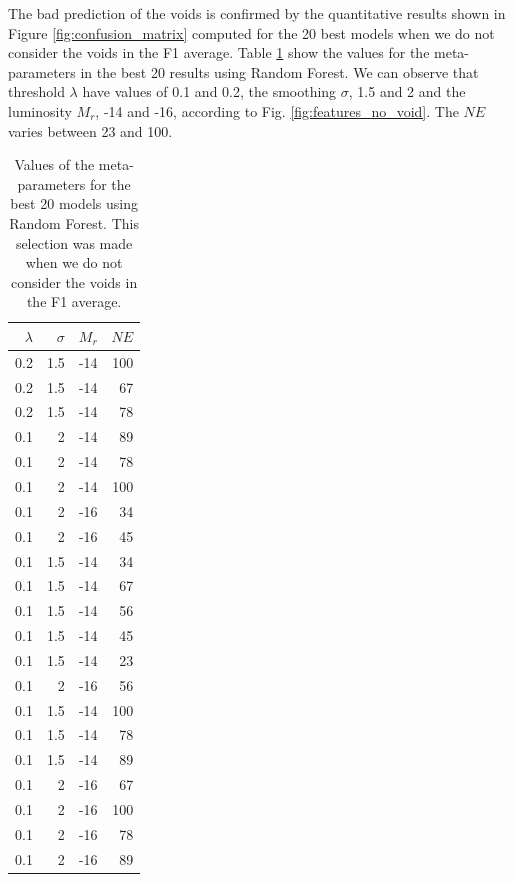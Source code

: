 \documentclass[usenatbib]{mnras}
\begin{document}
The bad prediction of the voids is confirmed by the quantitative results shown in Figure \ref{fig:confusion_matrix} computed for the 20 best models when we do not consider the voids in the F1 average. Table \ref{tab:models} show the values for the meta-parameters in the best 20 results using Random Forest. We can observe that threshold $\lambda$ have values of 0.1 and 0.2, the smoothing $\sigma$, 1.5 and 2 and the luminosity $M_r$, -14 and -16, according to Fig. \ref{fig:features_no_void}. The $NE$ varies between 23 and 100.
\begin{table}
\centering
\begin{tabular}{rrrr}
\hline
   $\lambda$ &   $\sigma$ &   $M_r$ &   $NE$ \\
\hline
         0.2 &        1.5 &     -14 &    100 \\
         0.2 &        1.5 &     -14 &     67 \\
         0.2 &        1.5 &     -14 &     78 \\
         0.1 &        2   &     -14 &     89 \\
         0.1 &        2   &     -14 &     78 \\
         0.1 &        2   &     -14 &    100 \\
         0.1 &        2   &     -16 &     34 \\
         0.1 &        2   &     -16 &     45 \\
         0.1 &        1.5 &     -14 &     34 \\
         0.1 &        1.5 &     -14 &     67 \\
         0.1 &        1.5 &     -14 &     56 \\
         0.1 &        1.5 &     -14 &     45 \\
         0.1 &        1.5 &     -14 &     23 \\
         0.1 &        2   &     -16 &     56 \\
         0.1 &        1.5 &     -14 &    100 \\
         0.1 &        1.5 &     -14 &     78 \\
         0.1 &        1.5 &     -14 &     89 \\
         0.1 &        2   &     -16 &     67 \\
         0.1 &        2   &     -16 &    100 \\
         0.1 &        2   &     -16 &     78 \\
         0.1 &        2   &     -16 &     89 \\
\hline
\end{tabular}
\caption{Values of the meta-parameters for the best 20 models using Random Forest. This selection was made when we do not consider the voids in the F1 average.}
\label{tab:models}
\end{table}
\end{document}
